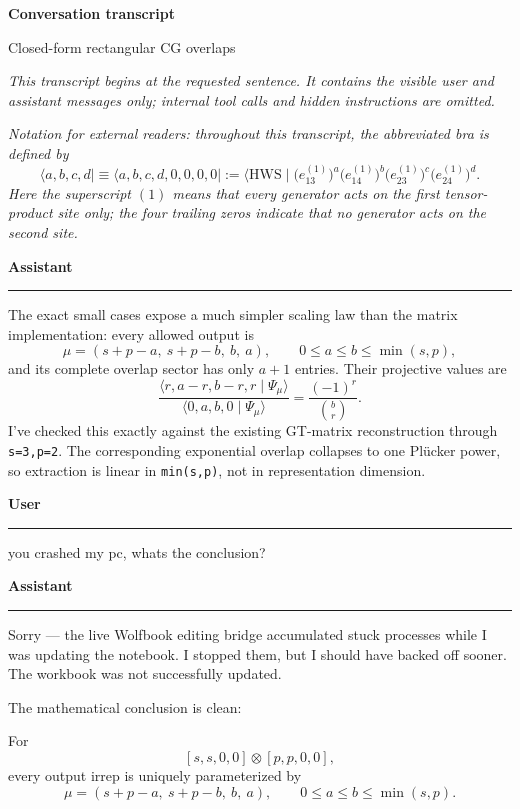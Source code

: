 \documentclass[11pt]{article}
\newcommand{\speaker}[2]{%
  \par\vspace{0.7em}%
  {\large\bfseries\color{#2}#1}\par
  \vspace{0.15em}\color{rulegray}\hrule\color{black}\vspace{0.55em}%
}
\newcommand{\Assistant}{\speaker{Assistant}{assistantblue}}
\newcommand{\User}{\speaker{User}{usergreen}}
\begin{document}
\begin{center}
  {\LARGE\bfseries Conversation transcript}\par
  \vspace{0.35em}
  {\Large Closed-form rectangular CG overlaps}\par
\end{center}

\vspace{0.8em}

\emph{This transcript begins at the requested sentence. It contains the visible user and
assistant messages only; internal tool calls and hidden instructions are omitted.}

\emph{Notation for external readers: throughout this transcript, the abbreviated bra is
defined by
\[
  \langle a,b,c,d\mid
  \equiv \langle a,b,c,d,0,0,0,0\mid
  := \langle \mathrm{HWS}\mid
  \bigl(e_{13}^{(1)}\bigr)^a
  \bigl(e_{14}^{(1)}\bigr)^b
  \bigl(e_{23}^{(1)}\bigr)^c
  \bigl(e_{24}^{(1)}\bigr)^d .
\]
Here the superscript \((1)\) means that every generator acts on the first tensor-product
site only; the four trailing zeros indicate that no generator acts on the second site.}

\Assistant

The exact small cases expose a much simpler scaling law than the matrix implementation:
every allowed output is
\[
  \mu=(s+p-a,\ s+p-b,\ b,\ a),
  \qquad 0\leq a\leq b\leq \min(s,p),
\]
and its complete overlap sector has only \(a+1\) entries. Their projective values are
\[
  \frac{\langle r,a-r,b-r,r\mid\Psi_\mu\rangle}
       {\langle0,a,b,0\mid\Psi_\mu\rangle}
  =\frac{(-1)^r}{\binom{b}{r}}.
\]
I've checked this exactly against the existing GT-matrix reconstruction through
\texttt{s=3,p=2}. The corresponding exponential overlap collapses to one Pl\"ucker power,
so extraction is linear in \texttt{min(s,p)}, not in representation dimension.

\User

you crashed my pc, whats the conclusion?

\Assistant

Sorry --- the live Wolfbook editing bridge accumulated stuck processes while I was updating
the notebook. I stopped them, but I should have backed off sooner. The workbook was not
successfully updated.

The mathematical conclusion is clean:

For
\[
  [s,s,0,0]\otimes[p,p,0,0],
\]
every output irrep is uniquely parameterized by
\[
  \mu=(s+p-a,\ s+p-b,\ b,\ a),
  \qquad 0\leq a\leq b\leq\min(s,p).
\]
\end{document}
